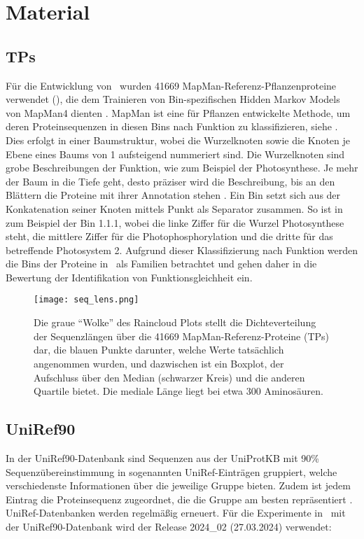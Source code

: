 \section{Material} %
\label{sec:material}
    \subsection{\aclp{TP}} %
        \label{sub:mapman}
        Für die Entwicklung von \protfin\ wurden 41669 MapMan-Referenz-Pflanzenproteine verwendet (), die dem Trainieren von Bin-spezifischen Hidden Markov Models von MapMan4 dienten \autocite{mapman}. MapMan ist eine für Pflanzen entwickelte Methode, um deren Proteinsequenzen in diesen Bins nach Funktion zu klassifizieren, siehe . Dies erfolgt in einer Baumstruktur, wobei die Wurzelknoten sowie die Knoten je Ebene eines Baums von 1 aufsteigend nummeriert sind. Die Wurzelknoten sind grobe Beschreibungen der Funktion, wie zum Beispiel der Photosynthese. Je mehr der Baum in die Tiefe geht, desto präziser wird die Beschreibung, bis an den Blättern die Proteine mit ihrer Annotation stehen \autocite{mapman}\autocite{mercator}. Ein Bin setzt sich aus der Konkatenation seiner Knoten mittels Punkt als Separator zusammen. So ist in  zum Beispiel der Bin 1.1.1, wobei die linke Ziffer für die Wurzel Photosynthese steht, die mittlere Ziffer für die Photophosphorylation und die dritte für das betreffende Photosystem 2. Aufgrund dieser Klassifizierung nach Funktion werden die Bins der Proteine in \protfin\ als Familien betrachtet und gehen daher in die Bewertung der Identifikation von Funktionsgleichheit ein.

        \begin{figure}[H]
            \texttt{[image: seq\_lens.png]}
            \caption[Raincloud Plot der \acl{TP} Sequenzlängen]{Die graue ``Wolke'' des Raincloud Plots stellt die Dichteverteilung der Sequenzlängen über die 41669 MapMan-Referenz-Proteine (\aclp{TP}) dar, die blauen Punkte darunter, welche Werte tatsächlich angenommen wurden, und dazwischen ist ein Boxplot, der Aufschluss über den Median (schwarzer Kreis) und die anderen Quartile bietet. Die mediale Länge liegt bei etwa 300 Aminosäuren.}
            \label{fig:sequences}
        \end{figure}

    \subsection{UniRef90} %
        \label{sub:uniref90}
        In der UniRef90-Datenbank sind Sequenzen aus der UniProtKB \autocite{uniprot} mit 90\% Sequenzübereinstimmung in sogenannten UniRef-Einträgen gruppiert, welche verschiedenste Informationen über die jeweilige Gruppe bieten. Zudem ist jedem Eintrag die Proteinsequenz zugeordnet, die die Gruppe am besten repräsentiert \autocite{uniref}. UniRef-Datenbanken werden regelmäßig erneuert. Für die Experimente in \protfin\ mit der UniRef90-Datenbank wird der Release 2024\_02 (27.03.2024) verwendet:

